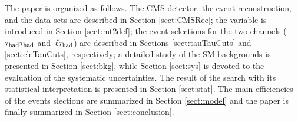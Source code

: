 The paper is organized as follows.  The CMS detector, the event reconstruction, and the data sets are described
in Section \ref{sect:CMSRec}; the \mttwo variable is introduced in Section \ref{sect:mt2def}; 
the event selections for the two channels ($\tau_{\rm had} \tau_{\rm had}$ and $\,\ell\tau_{\rm had}$)
are described in Sections \ref{sect:tauTauCuts} and \ref{sect:eleTauCuts}, respectively;
a detailed study of the SM backgrounds is presented in Section \ref{sect:bkg}, while Section \ref{sect:sys} 
is devoted to the evaluation of the systematic uncertainties.  The result of the search with its statistical interpretation is presented in 
Section \ref{sect:stat}. The main efficiencies of the events slections are summarized in Section \ref{sect:model} and the paper is finally summarized in Section \ref{sect:conclusion}.





